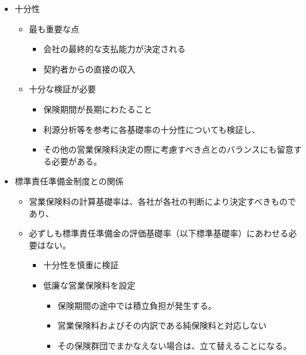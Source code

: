 \documentclass[]{article}
\begin{document}
\begin{itemize}
\tightlist
\item
  十分性

  \begin{itemize}
  \tightlist
  \item
    最も重要な点

    \begin{itemize}
    \tightlist
    \item
      会社の最終的な支払能力が決定される
    \item
      契約者からの直接の収入
    \end{itemize}
  \item
    十分な検証が必要

    \begin{itemize}
    \tightlist
    \item
      保険期間が長期にわたること
    \item
      利源分析等を参考に各基礎率の十分性についても検証し、
    
      \item
      その他の営業保険料決定の際に考慮すべき点とのバランスにも留意する必要がある。
    \end{itemize}
  \end{itemize}
\item
  標準責任準備金制度との関係

  \begin{itemize}
  \tightlist
  \item
    営業保険料の計算基礎率は、各社が各社の判断により決定すべきものであり、

  \item
      必ずしも標準責任準備金の評価基礎率（以下標準基礎率）にあわせる必要はない。

      \begin{itemize}
      \tightlist
      \item
        十分性を慎重に検証
      \item
        低廉な営業保険料を設定

        \begin{itemize}
        \tightlist
        \item
          保険期間の途中では積立負担が発生する。

          \item
            営業保険料およびその内訳である純保険料と対応しない
          \item
            その保険群団でまかなえない場合は、立て替えることになる。


\end{itemize}
\end{itemize}
\end{itemize}
\end{itemize}
\end{document}
